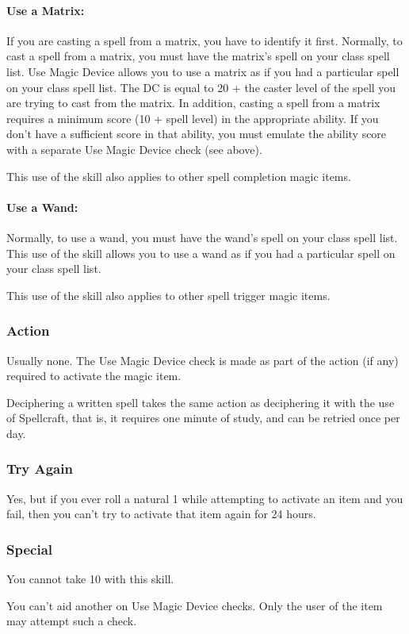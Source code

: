 \paragraph{Use a Matrix:}
If you are casting a spell from a matrix, you have to identify it first. 
Normally, to cast a spell from a matrix, you must have the matrix's spell on your class spell list. 
Use Magic Device allows you to use a matrix as if you had a particular spell on your class spell list. 
The DC is equal to 20 + the caster level of the spell you are trying to cast from the matrix.
In addition, casting a spell from a matrix requires a minimum score (10 + spell level) in the appropriate ability. 
If you don't have a sufficient score in that ability, you must emulate the ability score with a separate Use Magic Device check (see above).

This use of the skill also applies to other spell completion magic items.
\paragraph{Use a Wand:}
Normally, to use a wand, you must have the wand's spell on your class spell list. 
This use of the skill allows you to use a wand as if you had a particular spell on your class spell list. 

This use of the skill also applies to other spell trigger magic items.%
\subsubsection{Action}
Usually none. The Use Magic Device check is made as part of the action (if any) required to activate the magic item.

Deciphering a written spell takes the same action as deciphering it with the use of Spellcraft, that is, it requires one minute of study, and can be retried once per day.
\subsubsection{Try Again}
Yes, but if you ever roll a natural 1 while attempting to activate an item and you fail, then you can't try to activate that item again for 24 hours.
\subsubsection{Special}
You cannot take 10 with this skill.

You can't aid another on Use Magic Device checks. Only the user of the item may attempt such a check.

